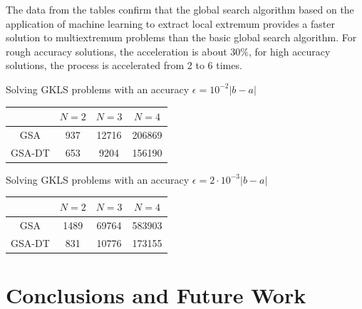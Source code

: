 \documentclass[entropy,article,submit,moreauthors,pdftex]{Definitions/mdpi}
\begin{document}
The data from the tables confirm that the global search algorithm based on the application of machine learning to extract local extremum provides a faster solution to multiextremum problems than the basic global search algorithm. For rough accuracy solutions, the acceleration is about  $30\%$, for high accuracy solutions, the process is accelerated from 2 to 6 times.

\begin{specialtable}[H] 
	\caption{Solving GKLS problems with an accuracy  $\epsilon = 10^{-2}\left|b-a\right|$}\label{table:average_GKLS01}
	\center
\begin{tabular}{cccc}
\toprule
        & $N=2$ & $N=3$  & $N=4$    \\
\midrule
GSA     &  937  &  12716 &  206869  \\
GSA-DT  &  653  &  9204  &  156190  \\
\bottomrule
\end{tabular}
\end{specialtable}

\begin{specialtable}[H] 
	\caption{Solving GKLS problems with an accuracy $\epsilon = 2 \cdot 10^{-3}\left|b-a\right|$}\label{table:average_GKLS002}
	\center
\begin{tabular}{cccc}
\toprule

       & $N=2$ & $N=3$  & $N=4$    \\
\midrule
GSA    & 1489  & 69764  & 583903  \\
GSA-DT & 831   & 10776  & 173155   \\
\bottomrule
\end{tabular}
\end{specialtable}



\section{Conclusions and Future Work}
\end{document}
